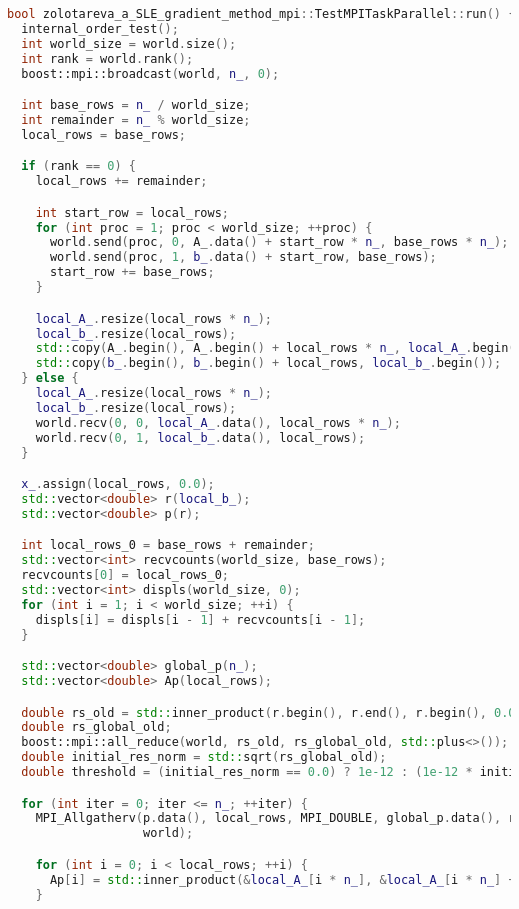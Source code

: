 \documentclass[12pt]{article}
\begin{document}
\begin{lstlisting}[language=C++]
bool zolotareva_a_SLE_gradient_method_mpi::TestMPITaskParallel::run() {
  internal_order_test();
  int world_size = world.size();
  int rank = world.rank();
  boost::mpi::broadcast(world, n_, 0);

  int base_rows = n_ / world_size;
  int remainder = n_ % world_size;
  local_rows = base_rows;

  if (rank == 0) {
    local_rows += remainder;

    int start_row = local_rows;
    for (int proc = 1; proc < world_size; ++proc) {
      world.send(proc, 0, A_.data() + start_row * n_, base_rows * n_);
      world.send(proc, 1, b_.data() + start_row, base_rows);
      start_row += base_rows;
    }

    local_A_.resize(local_rows * n_);
    local_b_.resize(local_rows);
    std::copy(A_.begin(), A_.begin() + local_rows * n_, local_A_.begin());
    std::copy(b_.begin(), b_.begin() + local_rows, local_b_.begin());
  } else {
    local_A_.resize(local_rows * n_);
    local_b_.resize(local_rows);
    world.recv(0, 0, local_A_.data(), local_rows * n_);
    world.recv(0, 1, local_b_.data(), local_rows);
  }

  x_.assign(local_rows, 0.0);
  std::vector<double> r(local_b_);
  std::vector<double> p(r);

  int local_rows_0 = base_rows + remainder;
  std::vector<int> recvcounts(world_size, base_rows);
  recvcounts[0] = local_rows_0;
  std::vector<int> displs(world_size, 0);
  for (int i = 1; i < world_size; ++i) {
    displs[i] = displs[i - 1] + recvcounts[i - 1];
  }

  std::vector<double> global_p(n_);
  std::vector<double> Ap(local_rows);

  double rs_old = std::inner_product(r.begin(), r.end(), r.begin(), 0.0);
  double rs_global_old;
  boost::mpi::all_reduce(world, rs_old, rs_global_old, std::plus<>());
  double initial_res_norm = std::sqrt(rs_global_old);
  double threshold = (initial_res_norm == 0.0) ? 1e-12 : (1e-12 * initial_res_norm);

  for (int iter = 0; iter <= n_; ++iter) {
    MPI_Allgatherv(p.data(), local_rows, MPI_DOUBLE, global_p.data(), recvcounts.data(), displs.data(), MPI_DOUBLE,
                   world);

    for (int i = 0; i < local_rows; ++i) {
      Ap[i] = std::inner_product(&local_A_[i * n_], &local_A_[i * n_] + n_, global_p.begin(), 0.0);
    }


\end{lstlisting}
\end{document}
